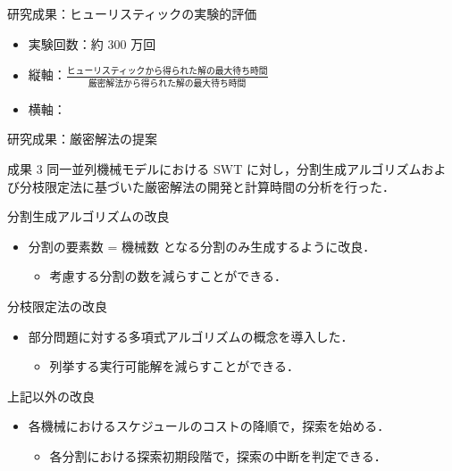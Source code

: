 \documentclass[dvipdfmx]{beamer}
\begin{document}
    \begin{frame}{研究成果：ヒューリスティックの実験的評価}
      \begin{itemize}
        \item 実験回数：約 $300$ 万回
        \item 縦軸：$\frac{\text{ヒューリスティックから得られた解の最大待ち時間}}{\text{厳密解法から得られた解の最大待ち時間}}$
        \item 横軸：
      \end{itemize}
    \end{frame}

    \begin{frame}{研究成果：厳密解法の提案}
      \begin{alertblock}{成果 3}
        同一並列機械モデルにおける SWT に対し，分割生成アルゴリズムおよび分枝限定法に基づいた厳密解法の開発と計算時間の分析を行った．
      \end{alertblock}
      \begin{block}{分割生成アルゴリズムの改良}
        \begin{itemize}
          \item \alert{分割の要素数 = 機械数} となる分割のみ生成するように改良．
          \begin{itemize}
            \item 考慮する分割の数を減らすことができる．
          \end{itemize}
        \end{itemize}
      \end{block}
      \begin{block}{分枝限定法の改良}
        \begin{itemize}
          \item \alert{部分問題に対する多項式アルゴリズム}の概念を導入した．
          \begin{itemize}
            \item 列挙する実行可能解を減らすことができる．
          \end{itemize}
        \end{itemize}
      \end{block}
      \begin{block}{上記以外の改良}
        \begin{itemize}
          \item 各機械におけるスケジュールのコストの降順で，探索を始める．
          \begin{itemize}
            \item 各分割における探索初期段階で，探索の中断を判定できる．
          \end{itemize}
        \end{itemize}
      \end{block}
    \end{frame}
\end{document}
